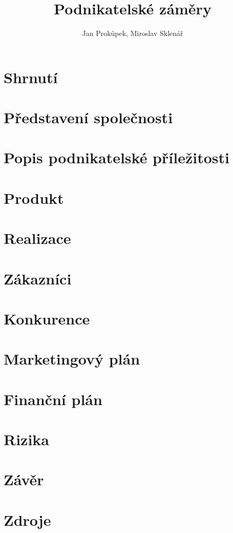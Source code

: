 \documentclass[12pt, a4paper]{article}
\begin{document}
\author{Jan Prokůpek, Miroslav Sklenář}
\title{\textbf{Podnikatelské záměry}}
\date{}

\maketitle

\pagebreak

\tableofcontents

\pagebreak

\section{Shrnutí}
\section{Představení společnosti}
\section{Popis podnikatelské příležitosti}
\section{Produkt}
\section{Realizace}
\section{Zákazníci}
\section{Konkurence}
\section{Marketingový plán}
\section{Finanční plán}
\section{Rizika}
\section{Závěr}
\section{Zdroje}
\end{document}
